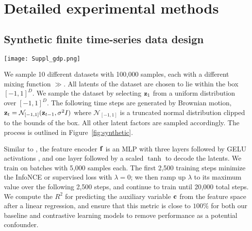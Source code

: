\section{Detailed experimental methods}

    \subsection{Synthetic finite time-series data design}
    \label{app:synthetic-data}
    
        \begin{figure*}[t]
            \centering
            \vspace{-6pt}
            \texttt{[image: Suppl\_gdp.png]}
            \caption{\textbf{Synthetic Data Generation Process.} We generate two sets of latent variables, $z_1$ and $z_2$, each consisting of 100,000 samples drawn from Brownian motion within a box $[-1,1]^d$. In this example, $z_1$ is connected to both $x_1$ and $x_2$, while $z_2$ is connected only to $x_2$. Additionally, we use an injective mixing function consisting of $g_1$ and $g_2$. Function $g_1$ takes 3 (denoted $d_1$) latent variables as input and outputs 25 neurons (denoted $n_1$), whereas $g_2$ takes 6 ($d_1+d2$) latent variables as input and outputs 25 neurons (denoted $n_2$). The final data $x$ is constructed by concatenating $x_1$ and $x_2$, resulting in a data matrix $x$ with a shape of 100,000 by 50.}
            \label{fig:synthetic}
        \end{figure*}
        

        We sample 10 different datasets with 100,000 samples, each with a different mixing function $\gg$.
        All latents of the dataset are chosen to lie within the box $[-1, 1]^D$.
        We sample the dataset by selecting $\mathbf{z}_1$ from a uniform distribution over $[-1, 1]^D$.
        The following time steps are generated by Brownian motion, $\mathbf{z}_{t} = \mathcal{N}_{[-1, 1]}(\mathbf{z}_{t-1}, \sigma^2 I)$ where $\mathcal{N}_{[-1, 1]}$ is a truncated normal distribution clipped to the bounds of the box. All other latent factors are sampled accordingly. The process is outlined in Figure~\ref{fig:synthetic}.


        Similar to \citet{schneider2023cebra}, the feature encoder $\mathbf{f}$ is an MLP with three layers followed by GELU activations \citep{hendrycks2016gaussian}, and one layer followed by a scaled $\tanh$ to decode the latents. We train on batches with 5,000 samples each. The first 2,500 training steps minimize the InfoNCE or supervised loss with $\lambda=0$; we then ramp up $\lambda$ to its maximum value over the following 2,500 steps, and continue to train until 20,000 total steps.
        We compute the $R^2$ for predicting the auxiliary variable $\mathbf{c}$ from the feature space after a linear regression, and ensure that this metric is close to $100\%$ for both our baseline and contrastive learning models to remove performance as a potential confounder.
  

